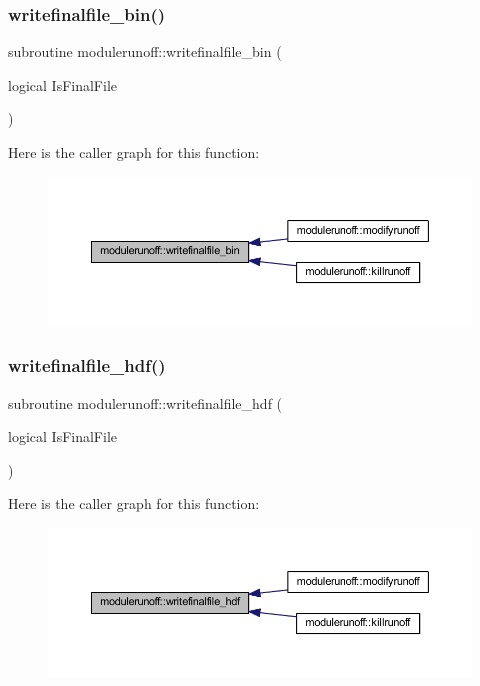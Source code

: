\subsubsection{\texorpdfstring{writefinalfile\+\_\+bin()}{writefinalfile\_bin()}}
{\footnotesize\ttfamily subroutine modulerunoff\+::writefinalfile\+\_\+bin (\begin{DoxyParamCaption}\item[{logical}]{Is\+Final\+File }\end{DoxyParamCaption})\hspace{0.3cm}{\ttfamily [private]}}

Here is the caller graph for this function\+:\nopagebreak
\begin{figure}[H]
\begin{center}
\leavevmode
\includegraphics[width=350pt]{namespacemodulerunoff_a2f27139bf5cc235ef3e04522e63d2f5d_icgraph}
\end{center}
\end{figure}
\mbox{\label{namespacemodulerunoff_af0a5f9cb46a0d94efdb301f1b582b7c4}} 
\subsubsection{\texorpdfstring{writefinalfile\+\_\+hdf()}{writefinalfile\_hdf()}}
{\footnotesize\ttfamily subroutine modulerunoff\+::writefinalfile\+\_\+hdf (\begin{DoxyParamCaption}\item[{logical}]{Is\+Final\+File }\end{DoxyParamCaption})\hspace{0.3cm}{\ttfamily [private]}}

Here is the caller graph for this function\+:\nopagebreak
\begin{figure}[H]
\begin{center}
\leavevmode
\includegraphics[width=350pt]{namespacemodulerunoff_af0a5f9cb46a0d94efdb301f1b582b7c4_icgraph}
\end{center}
\end{figure}


